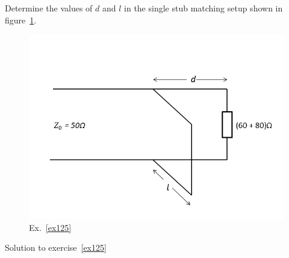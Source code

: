 \begin{ExerciseList}
\Exercise[label={ex125}]
Determine the values of $d$ and $l$ in the single stub matching setup shown in figure~\ref{fig:singlestubproblem}.
\begin{figure}[h]
\centering
\includegraphics[width=1\linewidth]{./graphics/Ex42}
\caption{Ex.~\ref{ex125}}
\label{fig:singlestubproblem}
\end{figure}
\Answer[ref={ex125}]
Solution to exercise~\ref{ex125}
\end{ExerciseList}
